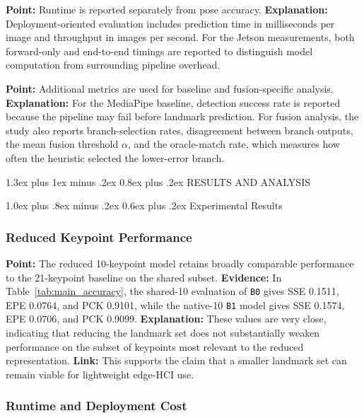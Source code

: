 \documentclass[10pt,letterpaper]{article}
\makeatletter
\renewcommand\section{\@startsection{section}{1}{\z@}%
  {1.3ex plus 1ex minus .2ex}%
  {0.8ex plus .2ex}%
  {\centering\normalfont\small\scshape}}
\renewcommand\subsection{\@startsection{subsection}{2}{\z@}%
  {1.0ex plus .8ex minus .2ex}%
  {0.6ex plus .2ex}%
  {\normalfont\itshape}}
\makeatother
\begin{document}
\medskip
\noindent\textbf{Point:} Runtime is reported separately from pose accuracy.  
\textbf{Explanation:} Deployment-oriented evaluation includes prediction time in milliseconds per image and throughput in images per second. For the Jetson measurements, both forward-only and end-to-end timings are reported to distinguish model computation from surrounding pipeline overhead.

\medskip
\noindent\textbf{Point:} Additional metrics are used for baseline and fusion-specific analysis.  
\textbf{Explanation:} For the MediaPipe baseline, detection success rate is reported because the pipeline may fail before landmark prediction. For fusion analysis, the study also reports branch-selection rates, disagreement between branch outputs, the mean fusion threshold $\alpha$, and the oracle-match rate, which measures how often the heuristic selected the lower-error branch.

\section{RESULTS AND ANALYSIS}

\subsection{Experimental Results}

\subsubsection{Reduced Keypoint Performance}

\noindent\textbf{Point:} The reduced 10-keypoint model retains broadly comparable performance to the 21-keypoint baseline on the shared subset.  
\textbf{Evidence:} In Table~\ref{tab:main_accuracy}, the shared-10 evaluation of \texttt{B0} gives SSE 0.1511, EPE 0.0764, and PCK 0.9101, while the native-10 \texttt{B1} model gives SSE 0.1574, EPE 0.0706, and PCK 0.9099.  
\textbf{Explanation:} These values are very close, indicating that reducing the landmark set does not substantially weaken performance on the subset of keypoints most relevant to the reduced representation.  
\textbf{Link:} This supports the claim that a smaller landmark set can remain viable for lightweight edge-HCI use.

\subsubsection{Runtime and Deployment Cost}
\end{document}
